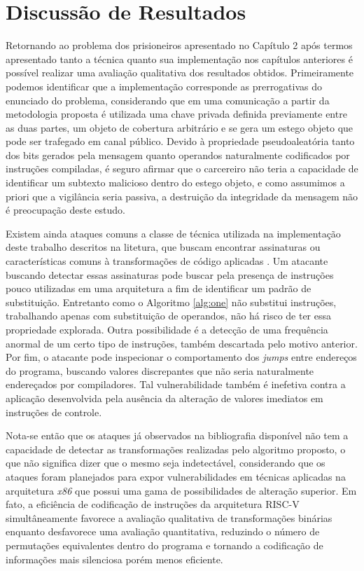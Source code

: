 \chapter{Discussão de Resultados}

Retornando ao problema dos prisioneiros apresentado no Capítulo 2 após termos apresentado tanto a técnica quanto sua implementação nos capítulos anteriores é possível realizar uma avaliação qualitativa dos resultados obtidos. Primeiramente podemos identificar que a implementação corresponde as prerrogativas do enunciado do problema, considerando que em uma comunicação a partir da metodologia proposta é utilizada uma chave privada definida previamente entre as duas partes, um objeto de cobertura arbitrário e se gera um estego objeto que pode ser trafegado em canal público. Devido à propriedade pseudoaleatória tanto dos bits gerados pela mensagem quanto operandos naturalmente codificados por instruções compiladas, é seguro afirmar que o carcereiro não teria a capacidade de identificar um subtexto malicioso dentro do estego objeto, e como assumimos a priori que a vigilância seria passiva, a destruição da integridade da mensagem não é preocupação deste estudo.

Existem ainda ataques comuns a classe de técnica utilizada na implementação deste trabalho descritos na litetura, que buscam encontrar assinaturas ou características comuns à transformações de código aplicadas \cite{ICISC04}. Um atacante buscando detectar essas assinaturas pode buscar pela presença de instruções pouco utilizadas em uma arquitetura a fim de identificar um padrão de substituição. Entretanto como o Algoritmo \ref{alg:one} não substitui instruções, trabalhando apenas com substituição de operandos, não há risco de ter essa propriedade explorada. Outra possibilidade é a detecção de uma frequência anormal de um certo tipo de instruções, também descartada pelo motivo anterior. Por fim, o atacante pode inspecionar o comportamento dos \textit{jumps} entre endereços do programa, buscando valores discrepantes que não seria naturalmente endereçados por compiladores. Tal vulnerabilidade também é inefetiva contra a aplicação desenvolvida pela ausência da alteração de valores imediatos em instruções de controle.

Nota-se então que os ataques já observados na bibliografia disponível não tem a capacidade de detectar as transformações realizadas pelo algoritmo proposto, o que não significa dizer que o mesmo seja indetectável, considerando que os ataques foram planejados para expor vulnerabilidades em técnicas aplicadas na arquitetura \textit{x86} que possui uma gama de possibilidades de alteração superior. Em fato, a eficiência de codificação de instruções da arquitetura RISC-V simultâneamente favorece a avaliação qualitativa de transformações binárias enquanto desfavorece uma avaliação quantitativa, reduzindo o número de permutações equivalentes dentro do programa e tornando a codificação de informações mais silenciosa porém menos eficiente.
